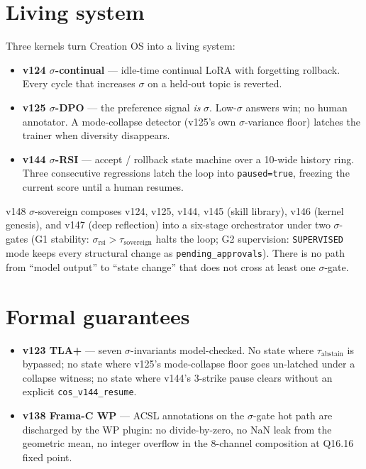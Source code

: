 \documentclass[11pt,letterpaper]{article}
\newcommand{\tabstain}{\tau_{\mathrm{abstain}}}
\newcommand{\code}[1]{\texttt{#1}}
\begin{document}
\section{Living system}

Three kernels turn Creation OS into a living system:

\begin{itemize}[leftmargin=*,itemsep=2pt]
  \item \textbf{v124 $\sigma$-continual} --- idle-time continual
    LoRA with forgetting rollback. Every cycle that increases
    $\sigma$ on a held-out topic is reverted.
  \item \textbf{v125 $\sigma$-DPO} --- the preference signal
    \emph{is} $\sigma$. Low-$\sigma$ answers win; no human
    annotator. A mode-collapse detector (v125's own
    $\sigma$-variance floor) latches the trainer when diversity
    disappears.
  \item \textbf{v144 $\sigma$-RSI} --- accept / rollback state
    machine over a 10-wide history ring. Three consecutive
    regressions latch the loop into \code{paused=true}, freezing
    the current score until a human resumes.
\end{itemize}

v148 $\sigma$-sovereign composes v124, v125, v144, v145 (skill
library), v146 (kernel genesis), and v147 (deep reflection) into a
six-stage orchestrator under two $\sigma$-gates (G1 stability:
$\sigma_{\mathrm{rsi}} > \tau_{\mathrm{sovereign}}$ halts the
loop; G2 supervision: \code{SUPERVISED} mode keeps every
structural change as \code{pending\_approvals}). There is no path
from ``model output'' to ``state change'' that does not cross at
least one $\sigma$-gate.

\section{Formal guarantees}

\begin{itemize}[leftmargin=*,itemsep=2pt]
  \item \textbf{v123 TLA+} --- seven $\sigma$-invariants
    model-checked. No state where $\tabstain$ is bypassed; no
    state where v125's mode-collapse floor goes un-latched under a
    collapse witness; no state where v144's 3-strike pause clears
    without an explicit \code{cos\_v144\_resume}.
  \item \textbf{v138 Frama-C WP} --- ACSL annotations on the
    $\sigma$-gate hot path are discharged by the WP plugin: no
    divide-by-zero, no NaN leak from the geometric mean, no
    integer overflow in the 8-channel composition at Q16.16 fixed
    point.
\end{itemize}
\end{document}
